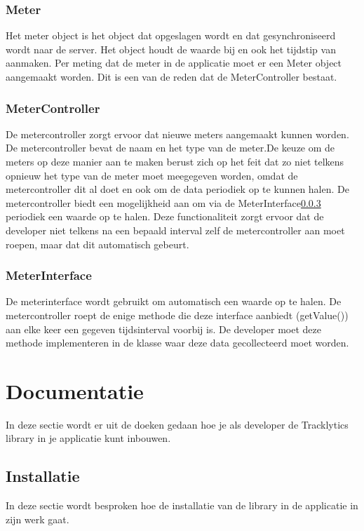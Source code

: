 \subsubsection{Meter}
Het meter object is het object dat opgeslagen wordt en dat gesynchroniseerd wordt naar de server. Het object houdt de waarde bij en ook het tijdstip van aanmaken. Per meting dat de meter in de applicatie moet er een Meter object aangemaakt worden. Dit is een van de reden dat de MeterController bestaat. 

\subsubsection{MeterController}
De metercontroller zorgt ervoor dat nieuwe meters aangemaakt kunnen worden. De metercontroller bevat de naam en het type van de meter.De keuze om de meters op deze manier aan te maken berust zich op het feit dat zo niet telkens opnieuw het type van de meter moet meegegeven worden, omdat de metercontroller dit al doet en ook om de data periodiek op te kunnen halen. De metercontroller biedt een mogelijkheid aan om via de MeterInterface\ref{Klassediagram:MeterInferface} periodiek een waarde op te halen. Deze functionaliteit zorgt ervoor dat de developer niet telkens na een bepaald interval zelf de metercontroller aan moet roepen, maar dat dit automatisch gebeurt.


\subsubsection{MeterInterface}\label{Klassediagram:MeterInferface}
De meterinterface wordt gebruikt om automatisch een waarde op te halen. De metercontroller roept de enige methode die deze interface aanbiedt (getValue()) aan elke keer een gegeven tijdsinterval voorbij is. De developer moet deze methode implementeren in de klasse waar deze data gecollecteerd moet worden.  


\section{Documentatie}\label{documentatie}
In deze sectie wordt er uit de doeken gedaan hoe je als developer de Tracklytics library in je applicatie kunt inbouwen. 

\subsection{Installatie}
In deze sectie wordt besproken hoe de installatie van de library in de applicatie in zijn werk gaat. \\

